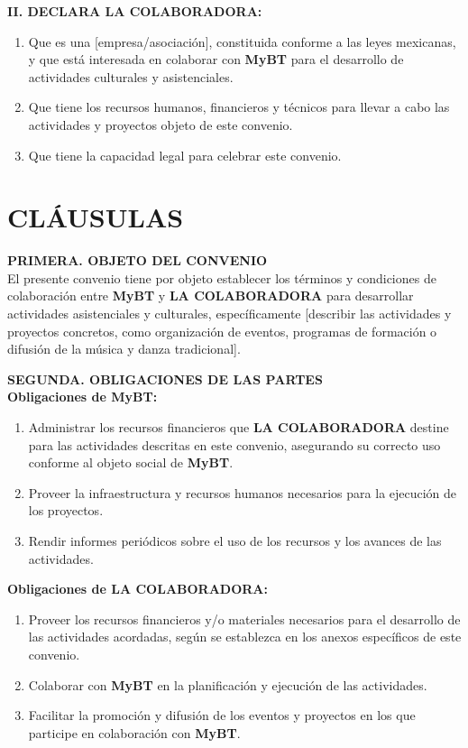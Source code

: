 \documentclass[a4paper,12pt]{article}
\begin{document}
\textbf{II. DECLARA LA COLABORADORA:}
\begin{enumerate}
    \item Que es una [empresa/asociación], constituida conforme a las leyes mexicanas, y que está interesada en colaborar con \textbf{MyBT} para el desarrollo de actividades culturales y asistenciales.
    \item Que tiene los recursos humanos, financieros y técnicos para llevar a cabo las actividades y proyectos objeto de este convenio.
    \item Que tiene la capacidad legal para celebrar este convenio.
\end{enumerate}

\section*{CLÁUSULAS}

\textbf{PRIMERA. OBJETO DEL CONVENIO}\\
El presente convenio tiene por objeto establecer los términos y condiciones de colaboración entre \textbf{MyBT} y \textbf{LA COLABORADORA} para desarrollar actividades asistenciales y culturales, específicamente [describir las actividades y proyectos concretos, como organización de eventos, programas de formación o difusión de la música y danza tradicional].

\textbf{SEGUNDA. OBLIGACIONES DE LAS PARTES}\\
\textbf{Obligaciones de MyBT:}
\begin{enumerate}
    \item Administrar los recursos financieros que \textbf{LA COLABORADORA} destine para las actividades descritas en este convenio, asegurando su correcto uso conforme al objeto social de \textbf{MyBT}.
    \item Proveer la infraestructura y recursos humanos necesarios para la ejecución de los proyectos.
    \item Rendir informes periódicos sobre el uso de los recursos y los avances de las actividades.
\end{enumerate}

\textbf{Obligaciones de LA COLABORADORA:}
\begin{enumerate}
    \item Proveer los recursos financieros y/o materiales necesarios para el desarrollo de las actividades acordadas, según se establezca en los anexos específicos de este convenio.
    \item Colaborar con \textbf{MyBT} en la planificación y ejecución de las actividades.
    \item Facilitar la promoción y difusión de los eventos y proyectos en los que participe en colaboración con \textbf{MyBT}.
\end{enumerate}
\end{document}
